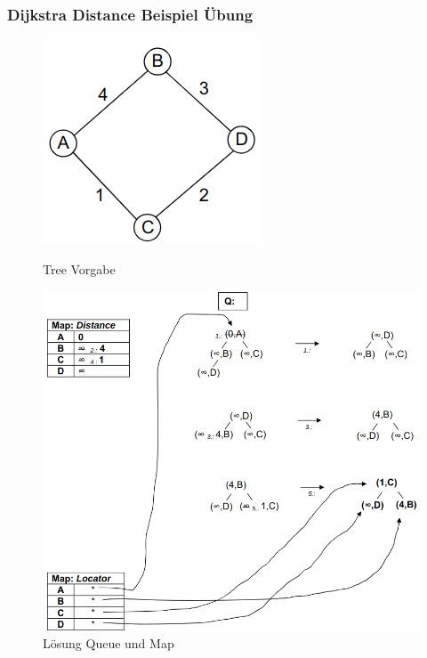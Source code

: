 \clearpage

\subsubsection{Dijkstra Distance Beispiel Übung}
\begin{figure}[ht!]
	\centering
	\begin{minipage}[t]{0.4\textwidth}
		\centering
		\includegraphics[width=\linewidth]{images/dijkstradistance1}
		\caption{Tree Vorgabe}
		\label{fig:treevorgabe}
	\end{minipage}
	\begin{minipage}[t]{0.9\textwidth}
		\centering
		\includegraphics[width=\linewidth]{images/dijkstradistance2}
		\caption{Lösung Queue und Map}
		\label{fig:loesungqueuemap}
	\end{minipage}
\end{figure}

